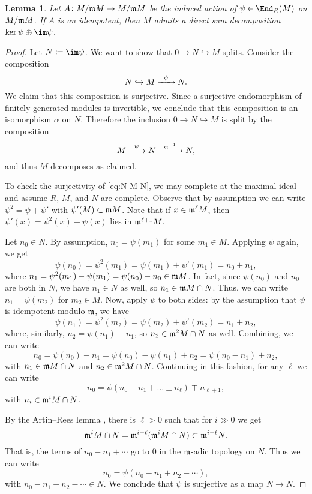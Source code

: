 \documentclass[12pt]{article}
\let\inc\hookrightarrow
\theoremstyle{theorem}
\numberwithin{thm}{section}
\newtheorem{lem}[thm]{Lemma}
\theoremstyle{definition}
\begin{document}
\begin{lem}\label{lem:idemp}
  Let $A\colon M/\mathfrak m M\to M/\mathfrak m M$ be the induced action of $\psi\in\End_R(M)$ on $M/\mathfrak m M$. If $A$ is an idempotent, then $M$ admits a direct sum decomposition $\ker\psi \oplus \im\psi$.
\end{lem}
\begin{proof}
  Let $N \coloneqq \im\psi$. We want to show that $0 \to N \inc M$ splits. Consider the composition
  \begin{equation}\label{eq:N-M-N}
    N \inc M \xra{\psi} N.
  \end{equation}
  We claim that this composition is surjective. Since a surjective endomorphism of finitely generated modules is invertible, we conclude that this composition is an isomorphism $\alpha$ on $N$.
  Therefore the inclusion $ 0 \to N \inc M $ is split by the composition
  \[ M \xra{\psi} N \xra{\alpha\inv} N, \]
  and thus $M$ decomposes as claimed.

  To check the surjectivity of \eqref{eq:N-M-N}, we may complete at the maximal ideal and assume $R$, $M$, and $N$ are complete. Observe that by assumption we can write $\psi^2 = \psi + \psi'$ with $\psi'(M)\subset \mathfrak m M$.
  Note that if $x \in \mathfrak m^\ell M$, then $\psi'(x) = \psi^2(x) - \psi(x)$ lies in $\mathfrak m^{\ell+1}M$.


  Let $n_0\in N$. By assumption, $n_0 = \psi(m_1)$ for some $m_1\in M$. Applying $\psi$ again, we get
  \[ \psi(n_0) = \psi^2(m_1) = \psi(m_1) + \psi'(m_1) = n_0 + n_1, \]
  where $n_1 = \psi^2(m_1) - \psi(m_1) = \psi(n_0) - n_0 \in \mathfrak m M$. In fact, since $\psi(n_0)$ and $n_0$ are both in $N$, we have $n_1\in N$ as well, so $n_1\in \mathfrak m M\cap N$. Thus, we can write $n_1 = \psi(m_2)$ for $m_2\in M$.
  Now, apply $\psi$ to both sides: by the assumption that $\psi$ is idempotent modulo $\mathfrak m$, we have
  \[ \psi(n_1)=\psi^2(m_2) = \psi(m_2) + \psi'(m_2) = n_1 + n_2, \]
  where, similarly, $n_2 = \psi(n_1) - n_1$, so $n_2 \in \mathfrak m^2M\cap N$ as well.
  Combining, we can write
  \[ n_0 = \psi(n_0) - n_1 = \psi(n_0) - \psi(n_1) + n_2 = \psi(n_0 - n_1) + n_2, \]
  with $n_1\in \mathfrak m M\cap N$ and $n_2\in \mathfrak m^2M\cap N$. Continuing in this fashion, for any $\ell$ we can write
  \[ n_0=\psi(n_0-n_1+\dots \pm n_{\ell}) \mp n_{\ell+1}, \]
  with $n_i \in \mathfrak m^i M\cap N$.

  By the Artin--Rees lemma \cite[Lemma~5.1]{Eisenbud95}, there is $\ell>0$ such that for $i\gg0$ we get
  \[ \mathfrak m^i M\cap N = \mathfrak m^{i-\ell} ( \mathfrak m^i M\cap N)\subset \mathfrak m^{i-\ell} N. \]
  That is, the terms of $n_0-n_1+\cdots$ go to 0 in the $\mathfrak m$-adic topology on $N$. Thus we can write
  \[ n_0 = \psi(n_0-n_1+n_2-\cdots), \]
  with $n_0-n_1+n_2-\cdots\in N$. We conclude that $\psi$ is surjective as a map $N\to N$.
\end{proof}
\end{document}
